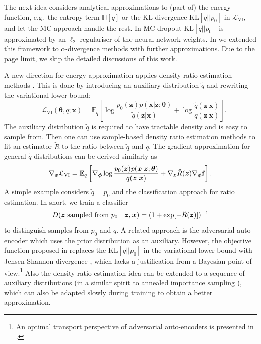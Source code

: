 The next idea considers analytical approximations to (part of) the energy function, e.g.~the entropy term $\mathbb{H}[q]$ or the KL-divergence $\mathrm{KL}[q||p_0]$ in $\mathcal{L}_{\text{VI}}$, and let the MC approach handle the rest. In MC-dropout \citep{gal:dropout2016} $\mathrm{KL}[q||p_0]$ is approximated by an $\ell_2$ regulariser of the neural network weights. In \citet{li:dropout2017} we extended this framework to $\alpha$-divergence methods with further approximations. Due to the page limit, we skip the detailed discussions of this work.


A new direction for energy approximation applies density ratio estimation methods \citep{qin:ratio1998, sugiyama:ratio2009, sugiyama:ratio2012}. This is done by introducing an auxiliary distribution $\tilde{q}$ and rewriting the variational lower-bound:
\begin{equation}
 \quad \mathcal{L}_{\text{VI}}(\bm{\theta}, q; \bm{x}) =  \mathbb{E}_{q} \left[ \log \frac{p_0(\bm{z}) p(\bm{x}|\bm{z} ; \bm{\theta})}{\tilde{q}(\bm{z}|\bm{x})} + \log \frac{\tilde{q}(\bm{z}|\bm{x})}{q(\bm{z}|\bm{x})} \right].
\end{equation}
The auxiliary distribution $\tilde{q}$ is required to have tractable density and is easy to sample from. Then one can use sample-based density ratio estimation methods to fit an estimator $\tilde{R}$ to the ratio between $\tilde{q}$ and $q$. The gradient approximation for general $\tilde{q}$ distributions can be derived similarly as
\begin{equation}
 \nabla_{\bm{\phi}} \mathcal{L}_{\text{VI}} = \mathbb{E}_{q} \left[ \nabla_{\bm{\phi}} \log \frac{p_0(\bm{z}) p(\bm{x}|\bm{z}; \bm{\theta})}{\tilde{q}(\bm{z}|\bm{x})} + \nabla_{\bm{z}} \tilde{R}(\bm{z}) \nabla_{\bm{\phi}} \mathbf{f} \right].
\end{equation}
%
A simple example considers $\tilde{q} = p_0$ and the classification approach for ratio estimation. In short, we train a classifier 
$$D(\bm{z} \text{ sampled from } p_0 ~|~\bm{z}, \bm{x}) = (1 + \exp[-\tilde{R}(\bm{z})])^{-1}$$
to distinguish samples from $p_0$ and $q$. A related approach is the adversarial auto-encoder \citep{makhzani:adversarial_ae2015} which uses the prior distribution as an auxiliary. However, the objective function proposed in \citet{makhzani:adversarial_ae2015} replaces the $\mathrm{KL}[q||p_0]$ in the variational lower-bound with Jensen-Shannon divergence \citep{lin:jensen_shannon1991}, which lacks a justification from a Bayesian point of view.\footnote{An optimal transport \citep{villani:optimal_transport2008} perspective of adversarial auto-encoders is presented in \citet{tolstikhin:wae2018}. } Also the density ratio estimation idea can be extended to a sequence of auxiliary distributions (in a similar spirit to annealed importance sampling \citep{neal:ais2001}), which can also be adapted slowly during training to obtain a better approximation.

